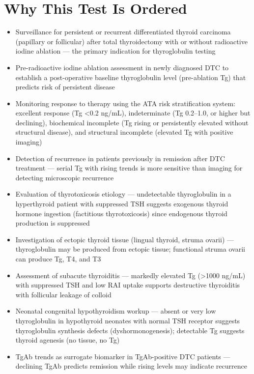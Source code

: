 \section*{Why This Test Is Ordered}
\begin{itemize}
  \item Surveillance for persistent or recurrent differentiated thyroid carcinoma (papillary or follicular) after total thyroidectomy with or without radioactive iodine ablation --- the primary indication for thyroglobulin testing
  \item Pre-radioactive iodine ablation assessment in newly diagnosed DTC to establish a post-operative baseline thyroglobulin level (pre-ablation Tg) that predicts risk of persistent disease
  \item Monitoring response to therapy using the ATA risk stratification system: excellent response (Tg <0.2 ng/mL), indeterminate (Tg 0.2--1.0, or higher but declining), biochemical incomplete (Tg rising or persistently elevated without structural disease), and structural incomplete (elevated Tg with positive imaging)
  \item Detection of recurrence in patients previously in remission after DTC treatment --- serial Tg with rising trends is more sensitive than imaging for detecting microscopic recurrence
  \item Evaluation of thyrotoxicosis etiology --- undetectable thyroglobulin in a hyperthyroid patient with suppressed TSH suggests exogenous thyroid hormone ingestion (factitious thyrotoxicosis) since endogenous thyroid production is suppressed
  \item Investigation of ectopic thyroid tissue (lingual thyroid, struma ovarii) --- thyroglobulin may be produced from ectopic tissue; functional struma ovarii can produce Tg, T4, and T3
  \item Assessment of subacute thyroiditis --- markedly elevated Tg (>1000 ng/mL) with suppressed TSH and low RAI uptake supports destructive thyroiditis with follicular leakage of colloid
  \item Neonatal congenital hypothyroidism workup --- absent or very low thyroglobulin in hypothyroid neonates with normal TSH receptor suggests thyroglobulin synthesis defects (dyshormonogenesis); detectable Tg suggests thyroid agenesis (no tissue, no Tg)
  \item TgAb trends as surrogate biomarker in TgAb-positive DTC patients --- declining TgAb predicts remission while rising levels may indicate recurrence
\end{itemize}


